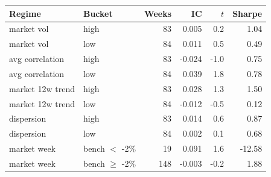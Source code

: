 \begin{tabular}{llrrrr}
\toprule
Regime & Bucket & Weeks & IC & $t$ & Sharpe \\
\midrule
market vol & high & 83 & 0.005 & 0.2 & 1.04 \\
market vol & low & 84 & 0.011 & 0.5 & 0.49 \\
avg correlation & high & 83 & -0.024 & -1.0 & 0.75 \\
avg correlation & low & 84 & 0.039 & 1.8 & 0.78 \\
market 12w trend & high & 83 & 0.028 & 1.3 & 1.50 \\
market 12w trend & low & 84 & -0.012 & -0.5 & 0.12 \\
dispersion & high & 83 & 0.014 & 0.6 & 0.87 \\
dispersion & low & 84 & 0.002 & 0.1 & 0.68 \\
market week & bench $<$ -2\% & 19 & 0.091 & 1.6 & -12.58 \\
market week & bench $\geq$ -2\% & 148 & -0.003 & -0.2 & 1.88 \\
\bottomrule
\end{tabular}
